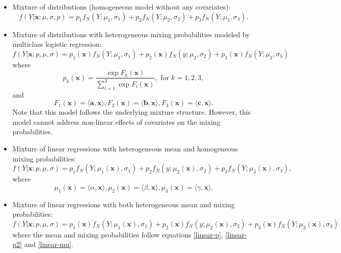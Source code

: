 \documentclass[11pt]{article}
\numberwithin{equation}{section}
\def\bx{\boldsymbol{x}}
\begin{document}
\begin{itemize}
	\item 	Mixture of distributions (homogeneous model without any covariates):
	\begin{equation}
		f(Y|\bx;\mu,\sigma,p)=p_1f_N(Y;\mu_1,\sigma_1)+p_2f_N(Y;\mu_2,\sigma_2)+p_3f_N(Y;\mu_3,\sigma_3).
	\end{equation}

\item 	Mixture of distributions with heterogeneous mixing probabilities modeled by multiclass logistic regression:
\begin{equation}
	f(Y|\bx;p,\mu,\sigma)=p_1(\bx)f_N(Y;\mu_1,\sigma_1)+p_2(\bx)f_N(y;\mu_2,\sigma_2)+p_3(\bx)f_N(Y;\mu_3,\sigma_3)
\end{equation}
where
\begin{equation}\label{linear-p}
	p_k(\bx)=\frac{\exp{F_k(\bx)}}{\sum_{l=1}^{3}\exp{F_l(\bx)}}, \text{ for } k=1,2,3,
\end{equation}
and 
\begin{equation}\label{linear-p2}
	F_1(\bx)=\langle \boldsymbol{a},\bx\rangle, F_2(\bx)=\langle \boldsymbol{b},\bx\rangle,F_3(\bx)=\langle \boldsymbol{c},\bx\rangle.
\end{equation}
Note that this model follows the underlying mixture structure. However, this model cannot address non-linear effects of covariates on the mixing probabilities.

	\item 	Mixture of linear regressions with heterogeneous mean and homogeneous mixing probabilities:
	\begin{equation}
		f(Y|\bx;p,\mu,\sigma)=p_1f_N(Y;\mu_1(\bx),\sigma_1)+p_2f_N(y;\mu_2(\bx),\sigma_2)+p_3f_N(Y;\mu_3(\bx),\sigma_3),
	\end{equation}
where
\begin{equation}\label{linear-mu}
\mu_1(\bx)=\langle\alpha,\bx\rangle, \mu_2(\bx)=\langle\beta,\bx\rangle,\mu_3(\bx)=\langle\gamma,\bx\rangle.
\end{equation}



	\item 	Mixture of linear regressions with both heterogeneous mean and mixing probabilities:
	\begin{equation}
		f(Y|\bx;p,\mu,\sigma)=p_1(\bx)f_N(Y;\mu_1(\bx),\sigma_1)+p_2(\bx)f_N(y;\mu_2(\bx),\sigma_2)+p_3(\bx)f_N(Y;\mu_3(\bx),\sigma_3)
	\end{equation}
where the mean and mixing probabilities follow equations \eqref{linear-p}, \eqref{linear-p2} and \eqref{linear-mu}.


\end{itemize}
\end{document}
